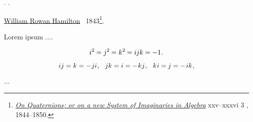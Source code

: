 

\label{section:quaternions}

\ru{\:---}
.
.

\href{https://en.wikipedia.org/wiki/William_Rowan_Hamilton}{William Rowan Hamilton}
~1843\footnote{%
\href{https://www.maths.tcd.ie/pub/HistMath/People/Hamilton/OnQuat/OnQuat.pdf}{\emph{On Quaternions; or on a new System of Imaginaries in Algebra}}
\href{https://en.wikipedia.org/wiki/William_Rowan_Hamilton}{}
\en{\hbox{\hspace{-0.5ex},}}
xxv\hbox{--}xxxvi\en{,}
3
,
1844\hbox{--}1850.%
}\hbox{\hspace{-0.5ex}.}


Lorem ipsum ....


\begin{equation}\label{theformulaforquaternions}
i^2 \hspace{-0.1ex} = j^2 \hspace{-0.1ex} = k^2 \hspace{-0.1ex} = i \hspace{-0.1ex} j k = -1
\hspace{.2ex} .
\end{equation}

\begin{equation}\label{moredefinitionalequationsforquaternions}
ij = k = - \hspace{.1ex} ji \hspace{.1ex} , \hspace{.7em}
jk = i = - \hspace{.1ex} kj \hspace{.1ex} , \hspace{.7em}
k \hspace{.1ex} i = \hspace{-0.1ex} j = - \hspace{.2ex} ik \hspace{.1ex} ,
\end{equation}


...


